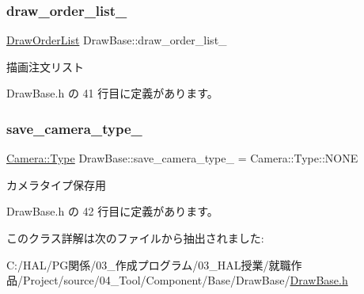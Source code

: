 \subsubsection{\texorpdfstring{draw\+\_\+order\+\_\+list\+\_\+}{draw\_order\_list\_}}
{\footnotesize\ttfamily \mbox{\hyperlink{class_draw_order_list}{Draw\+Order\+List}} Draw\+Base\+::draw\+\_\+order\+\_\+list\+\_\+\hspace{0.3cm}{\ttfamily [private]}}



描画注文リスト 



 Draw\+Base.\+h の 41 行目に定義があります。

\mbox{\label{class_draw_base_aa8be4980756a0af7cc76dfe455c492d4}} 
\subsubsection{\texorpdfstring{save\+\_\+camera\+\_\+type\+\_\+}{save\_camera\_type\_}}
{\footnotesize\ttfamily \mbox{\hyperlink{class_camera_a3b0a1f58deca679ac665f61c480d1dcb}{Camera\+::\+Type}} Draw\+Base\+::save\+\_\+camera\+\_\+type\+\_\+ = Camera\+::\+Type\+::\+N\+O\+NE\hspace{0.3cm}{\ttfamily [private]}}



カメラタイプ保存用 



 Draw\+Base.\+h の 42 行目に定義があります。



このクラス詳解は次のファイルから抽出されました\+:\begin{DoxyCompactItemize}
\item 
C\+:/\+H\+A\+L/\+P\+G関係/03\+\_\+作成プログラム/03\+\_\+\+H\+A\+L授業/就職作品/\+Project/source/04\+\_\+\+Tool/\+Component/\+Base/\+Draw\+Base/\mbox{\hyperlink{_draw_base_8h}{Draw\+Base.\+h}}\end{DoxyCompactItemize}

